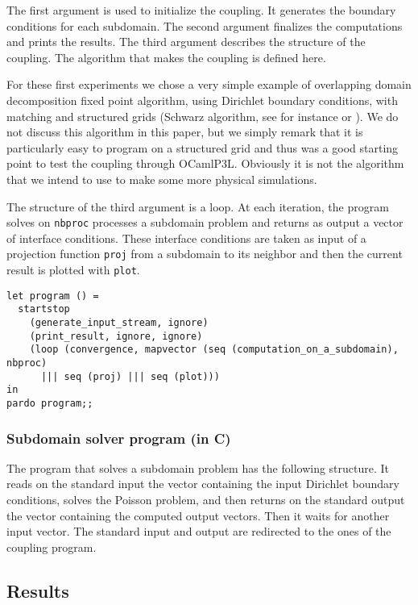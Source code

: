 \documentclass{article}
\begin{document}
The first argument is used to initialize the coupling. It generates
the boundary conditions for each subdomain. The second argument
finalizes the computations and prints the results. The third argument
describes the structure of the coupling. The algorithm that makes the
coupling is defined here. 

For these first experiments we chose a very simple example of overlapping
domain decomposition fixed point algorithm, using Dirichlet boundary
conditions, with matching and structured grids (Schwarz algorithm, see for
instance \cite{MR1857663} or \cite{MR95b:65147}). We do not discuss this
algorithm in this paper, but we simply remark that it is particularly easy to
program on a structured grid and thus was a good starting point to test the
coupling through OCamlP3L. Obviously it is not the algorithm that we intend to
use to make some more physical simulations.

The structure of the third argument is a loop. At each iteration, the program
solves on {\tt nbproc} processes a subdomain problem and returns as output a
vector of interface conditions. These interface conditions are taken as input
of a projection function {\tt proj} from a subdomain to its neighbor and then
the current result is plotted with {\tt plot}.
\begin{verbatim}
let program () = 
  startstop
    (generate_input_stream, ignore)
    (print_result, ignore, ignore)
    (loop (convergence, mapvector (seq (computation_on_a_subdomain), nbproc)
      ||| seq (proj) ||| seq (plot)))
in
pardo program;;
\end{verbatim}

\subsubsection*{Subdomain solver program (in C)}

The program that solves a subdomain problem has the following structure. It
reads on the standard input the vector containing the input Dirichlet boundary
conditions, solves the Poisson problem, and then returns on the standard output
the vector containing the computed output vectors. Then it waits for another
input vector.
The standard input and
output are redirected to the ones of the coupling program.

\subsection{Results}
\label{ss:dd-not}
\end{document}
